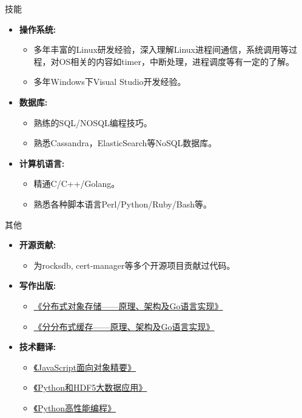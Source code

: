 \documentclass[11pt,oneside]{article}
\newenvironment{ressection}[1]{
	\vspace{4pt}
	{\selectfont\Large#1}
	\begin{itemize}
	\vspace{3pt}
}{
	\end{itemize}
}
\newcommand{\resitem}[1]{
	\vspace{-4pt}
	\item \begin{flushleft} #1 \end{flushleft}
}
\newcommand{\ressubitem}[1]{
	\vspace{-1pt}
	\item \begin{flushleft} #1 \end{flushleft}
}
\newenvironment{reslist}[1]{
	\resitem{\textbf{#1}}
	\vspace{-5pt}
	\begin{itemize}
}{
	\end{itemize}
}
\begin{document}
\begin{CJK}{UTF8}{gkai}
\begin{ressection}{技能}
	\begin{reslist}{操作系统:}
		\ressubitem{多年丰富的Linux研发经验，深入理解Linux进程间通信，系统调用等过程，对OS相关的内容如timer，中断处理，进程调度等有一定的了解。}
		\ressubitem{多年Windows下Visual Studio开发经验。}
	\end{reslist}

	\begin{reslist}{数据库:}
		\ressubitem{熟练的SQL/NOSQL编程技巧。}
		\ressubitem{熟悉Cassandra，ElasticSearch等NoSQL数据库。}
	\end{reslist}

	\begin{reslist}{计算机语言:}
		\ressubitem{精通C/C++/Golang。}
		\ressubitem{熟悉各种脚本语言Perl/Python/Ruby/Bash等。}
	\end{reslist}

\end{ressection}

\begin{ressection}{其他}

	\begin{reslist}{开源贡献:}
		\ressubitem{为rocksdb, cert-manager等多个开源项目贡献过代码。}
	\end{reslist}

	\begin{reslist}{写作出版:}
		\ressubitem{\href{https://item.jd.com/60796801160.html}{《分布式对象存储——原理、架构及Go语言实现》}}
		\ressubitem{\href{https://item.jd.com/12495484.html}{《分分布式缓存——原理、架构及Go语言实现》}}
	\end{reslist}

	\begin{reslist}{技术翻译:}
		\ressubitem{\href{https://www.epubit.com/book/detail/33175}{《JavaScript面向对象精要》}}
		\ressubitem{\href{https://www.epubit.com/book/detail/15126}{《Python和HDF5大数据应用》}}
		\ressubitem{\href{https://www.epubit.com/book/detail/14722}{《Python高性能编程》}}
	\end{reslist}

\end{ressection}
\end{CJK}
\end{document}
